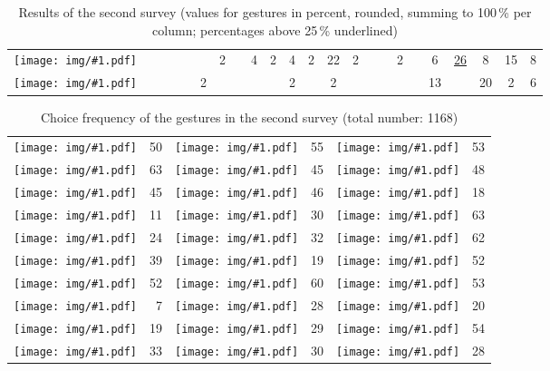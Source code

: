 \documentclass{aes130}
\newcommand{\sixthpic}[1][]{\texttt{[image: img/\#1.pdf]}}
\begin{document}
\begin{table*}
\begin{center}
\begin{tabular}{|c|c|c|c|c|c|c|c|c|c|c|c|c|c|c|c|c|c|c|c|c|c|c|}
\sixthpic[multi-spread-horizontal]
 &    &    &    &    &    &  2 &    &  4 &  2 &  4 &  2 & 22 &  2 &    &    &  2 &    &  6 & \underline{26} &  8 & 15 &  8 \\ \cline{2-23}

\sixthpic[multi-spread-vertical]
 &    &    &    &    &  2 &    &    &    &    &  2 &    &  2 &    &    &    &    &    & 13 &    & 20 &  2 &  6 \\ \cline{1-23}
\end{tabular}
\end{center}
\caption{Results of the second survey (values for gestures in percent, rounded, summing to 100\,\%{} per column; percentages above 25\,\%{} underlined)}\label{tab:Survey2Results}
\end{table*}

\begin{table} 
\begin{center}
\begin{tabular}{cr|cr|cr} 

\sixthpic[tap]        & 50 & \sixthpic[tap-hold]   & 55 & \sixthpic[rotate-clockwise]        & 53 \\ 
\sixthpic[tap-double] & 63 & \sixthpic[triangle]   & 45 & \sixthpic[rotate-counterclockwise] & 48 \\ 
\sixthpic[right]      & 45 & \sixthpic[up]         &  46 & \sixthpic[digits]                  & 18 \\ 
\sixthpic[right-up]   &  11 & \sixthpic[up-left]    & 30 & \sixthpic[letters]                 & 63 \\ 
\sixthpic[right-down] &  24 & \sixthpic[up-right]   &  32 & \sixthpic[sign-x]                  & 62 \\ 
\sixthpic[right-left] & 39 & \sixthpic[up-down]    & 19 & \sixthpic[sign-+]                  & 52 \\ 
\sixthpic[left]       &  52 & \sixthpic[down]       & 60 & \sixthpic[multi-pinch-horizontal]  &  53 \\ 
\sixthpic[left-up]    &  7 & \sixthpic[down-left]  & 28 & \sixthpic[multi-pinch-vertical]    &  20 \\ 
\sixthpic[left-down]  & 19 & \sixthpic[down-right] &  29 & \sixthpic[multi-spread-horizontal] & 54 \\ 
\sixthpic[left-right] & 33 & \sixthpic[down-up]    & 30 & \sixthpic[multi-spread-vertical]   &  28 \\

\end{tabular}
\end{center}
\caption{Choice frequency of the gestures in the second survey (total number: 1168)}
\label{tab:Survey2CumulativePopularity}
\end{table}
\end{document}

